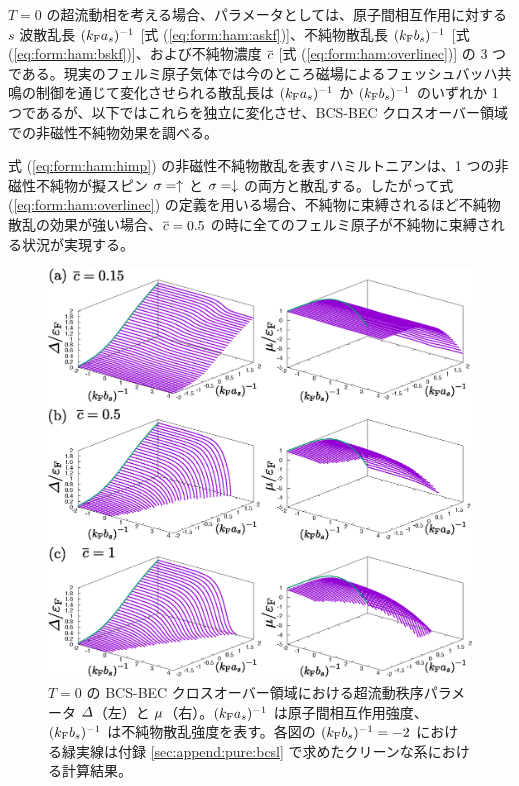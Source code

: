 \label{sec:bcsl:bsi}

$T=0$ の超流動相を考える場合、パラメータとしては、原子間相互作用に対する $s$ 波散乱長 $(k_{\text{F}} a_s)^{-1}$ [式 (\ref{eq:form:ham:askf})]、不純物散乱長 $(k_{\text{F}} b_s)^{-1}$ [式 (\ref{eq:form:ham:bskf})]、および不純物濃度 $\overline{c}$ [式 (\ref{eq:form:ham:overlinec})] の 3 つである。現実のフェルミ原子気体では今のところ磁場によるフェッシュバッハ共鳴の制御を通じて変化させられる散乱長は $(k_{\text{F}} a_s)^{-1}$ か $(k_{\text{F}} b_s)^{-1}$ のいずれか 1 つであるが、以下ではこれらを独立に変化させ、BCS-BEC クロスオーバー領域での非磁性不純物効果を調べる。

式 (\ref{eq:form:ham:himp}) の非磁性不純物散乱を表すハミルトニアンは、1 つの非磁性不純物が擬スピン $\sigma=\uparrow$ と $\sigma=\downarrow$ の両方と散乱する。したがって式 (\ref{eq:form:ham:overlinec}) の定義を用いる場合、不純物に束縛されるほど不純物散乱の効果が強い場合、$\overline{c}=0.5$ の時に全てのフェルミ原子が不純物に束縛される状況が実現する。

\begin{figure}[t]
\centering
\includegraphics[width=130mm]{eps/sp-tc-cpt.eps}
\caption{$T=0$ の BCS-BEC クロスオーバー領域における超流動秩序パラメータ $\varDelta$（左）と $\mu$（右）。$(k_{\text{F}} a_s)^{-1}$ は原子間相互作用強度、$(k_{\text{F}} b_s)^{-1}$ は不純物散乱強度を表す。各図の $(k_{\text{F}} b_s)^{-1} = -2$ における緑実線は付録 \ref{sec:append:pure:bcsl} で求めたクリーンな系における計算結果。}
\label{fig:bcsl:imp:cccc}
\end{figure}

